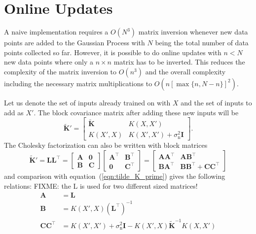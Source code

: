 \documentclass[11pt,a4paper]{scrreprt}
\newcommand{\mat}[1]{\bm{#1}}
\newcommand{\T}{^{\top}}
\begin{document}

\section{Online Updates}
A naive implementation requires a $O(N^3)$ matrix inversion whenever new data 
points are added to the Gaussian Process with $N$ being the total number of data 
points collected so far. However, it is possible to do online updates with $n 
< N$ new data points where only a $n \times n$ matrix has to be inverted. This 
reduces the complexity of the matrix inversion to $O(n^3)$ and the overall 
complexity including the necessary matrix multiplications to $O(n [\max\{n, 
N - n\}]^2)$.

Let us denote the set of inputs already trained on with $X$ and the set of 
inputs to add as $X'$. The block covariance matrix after adding these new inputs 
will be
\begin{equation} \label{eqn:tilde_K_prime}
    \tilde{\mat K}' = \left[ \begin{array}{cc}
            \tilde{\mat K} & K(X, X') \\ K(X', X) & K(X', X') 
            + \sigma_{\text{n}}^2\mat I
        \end{array}
    \right]\text{.}
\end{equation}
The Cholesky factorization can also be written with block matrices
\begin{equation}
    \tilde{\mat K}' = \mat L \mat L\T = \left[
        \begin{array}{cc}
            \mat A & \mat 0 \\ \mat B & \mat C
        \end{array}
    \right] \left[
        \begin{array}{cc}
            \mat A\T & \mat B\T \\ \mat 0 & \mat C\T
        \end{array}
    \right] = \left[
        \begin{array}{cc}
            \mat A \mat A\T & \mat A \mat B\T \\ \mat B \mat A\T & \mat B \mat 
            B\T + \mat C \mat C\T
        \end{array}
    \right]
\end{equation}
and comparison with equation~(\ref{eqn:tilde_K_prime}) gives the following 
relations:
FIXME: the L is used for two different sized matrices!
\begin{align}
    \mat A &= \mat L \\
    \mat B &= K(X', X) (\mat L\T)^{-1} \\
    \mat C \mat C\T &= K(X', X') + \sigma_{\text{n}}^2\mat I - K(X', 
    X)\tilde{\mat K}^{-1}K(X, X')
\end{align}
\end{document}
